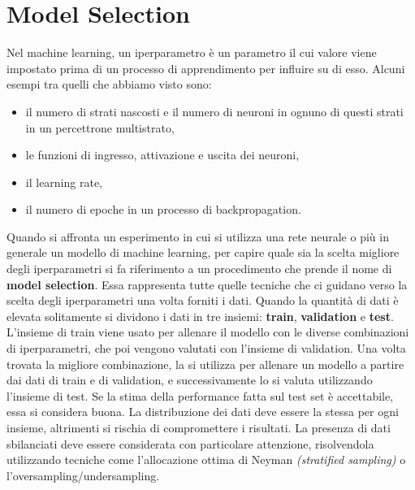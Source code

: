 \documentclass[12pt, twoside, letterpaper]{report}
\begin{document}
		\section{Model Selection} 
			Nel machine learning, un iperparametro è un parametro il cui valore viene impostato prima di un processo di apprendimento per influire su di esso. Alcuni esempi tra quelli che abbiamo visto sono: 
			\begin{itemize}
				\item il numero di strati nascosti e il numero di neuroni in ognuno di questi strati in un percettrone multistrato,
				\item le funzioni di ingresso, attivazione e uscita dei neuroni, 
				\item il learning rate,
				\item il numero di epoche in un processo di backpropagation.
			\end{itemize}
			Quando si affronta un esperimento in cui si utilizza una rete neurale o più in generale un modello di machine learning, per capire quale sia la scelta migliore degli iperparametri si fa riferimento a un procedimento che prende il nome di \textbf{model selection}. Essa rappresenta tutte quelle tecniche che ci guidano verso la scelta degli iperparametri una volta forniti i dati. Quando la quantità di dati è elevata solitamente si dividono i dati in tre insiemi: \textbf{train}, \textbf{validation} e \textbf{test}. L'insieme di train viene usato per allenare il modello con le diverse combinazioni di iperparametri, che poi vengono valutati con l'insieme di validation. Una volta trovata la migliore combinazione, la si utilizza per allenare un modello a partire dai dati di train e di validation, e successivamente lo si valuta utilizzando l'insieme di test. Se la stima della performance fatta sul test set è accettabile, essa si considera buona. La distribuzione dei dati deve essere la stessa per ogni insieme, altrimenti si rischia di compromettere i risultati. La presenza di dati sbilanciati deve essere considerata con particolare attenzione, risolvendola utilizzando tecniche come l'allocazione ottima di Neyman \textit{(stratified sampling)} \cite{neyman} o l'oversampling/undersampling. 
			
\end{document}
